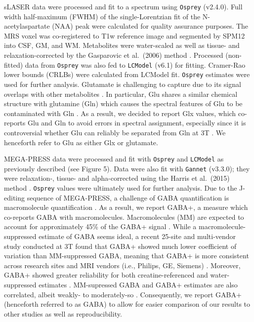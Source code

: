 \documentclass[
true
]{sn-jnl}
\begin{document}
sLASER data were processed and fit to a spectrum using \texttt{Osprey}
\citep{oeltzschnerOspreyOpenSourceProcessing2020} (v2.4.0). Full width
half-maximum (FWHM) of the single-Lorentzian fit of the
N-acetylaspartate (NAA) peak were calculated for quality assurance
purposes. The MRS voxel was co-registered to T1w reference image and
segmented by SPM12 \citep{fristonStatisticalParametricMapping2007} into
CSF, GM, and WM. Metabolites were water-scaled as well as tissue- and
relaxation-corrected by the Gasparovic et al.~(2006) method
\citep{gasparovicUseTissueWater2006}. Processed (non-fitted) data from
\texttt{Osprey} was also fed to \texttt{LCModel}
\citep{provencherAutomaticQuantitationLocalized2001} (v6.1) for fitting.
Cramer-Rao lower bounds (CRLBs) were calculated from LCModel fit.
\texttt{Osprey} estimates were used for further analysis. Glutamate is
challenging to capture due to its signal overlaps with other metabolites
\citep{pasantaFunctionalMRSStudies2023}. In particular, Glu shares a
similar chemical structure with glutamine (Gln) which causes the
spectral features of Glu to be contaminated with Gln
\citep{ramadanGlutamateGlutamineReview2013}. As a result, we decided to
report Glx values, which co-reports Glu and Gln to avoid errors in
spectral assignment, especially since it is controversial whether Glu
can reliably be separated from Gln at 3T
\citep{pasantaFunctionalMRSStudies2023, ramadanGlutamateGlutamineReview2013}.
We henceforth refer to Glu as either Glx or glutamate.

MEGA-PRESS data were processed and fit with \texttt{Osprey} and
\texttt{LCModel} as previously described (see Figure 5). Data were also
fit with \texttt{Gannet} (v3.3.0); they were relaxation-, tissue- and
alpha-corrected using the Harris et al.~(2015) method
\citep{harrisSpectralEditingMeasurementsGABA2015}. \texttt{Osprey}
values were ultimately used for further analysis. Due to the J-editing
sequence of MEGA-PRESS, a challenge of GABA quantification is
macromolecule quantification
\citep{harrisSpectralEditingMeasurementsGABA2015}. As a result, we
report GABA+, a measure which co-reports GABA with macromolecules.
Macromolecules (MM) are expected to account for approximately 45\% of
the GABA+ signal \citep{harrisSpectralEditingMeasurementsGABA2015}.
While a macromolecule-suppressed estimate of GABA seems ideal, a recent
25-site and multi-vendor study conducted at 3T found that GABA+ showed
much lower coefficient of variation than MM-suppressed GABA, meaning
that GABA+ is more consistent across research sites and MRI vendors
(i.e., Philips, GE, Siemens) \citep{mikkelsenBigGABAII2019}. Moreover,
GABA+ showed greater reliability for both creatine-referenced and
water-suppressed estimates
\citep{mikkelsenBigGABAEdited2017, mikkelsenBigGABAII2019}. MM-supressed
GABA and GABA+ estimates are also correlated, albeit weakly- to
moderately-so
\citep{harrisSpectralEditingMeasurementsGABA2015, mikkelsenBigGABAII2019, mikkelsenBigGABAEdited2017}.
Consequently, we report GABA+ (henceforth referred to as GABA) to allow
for easier comparison of our results to other studies as well as
reproducibility.
\end{document}
